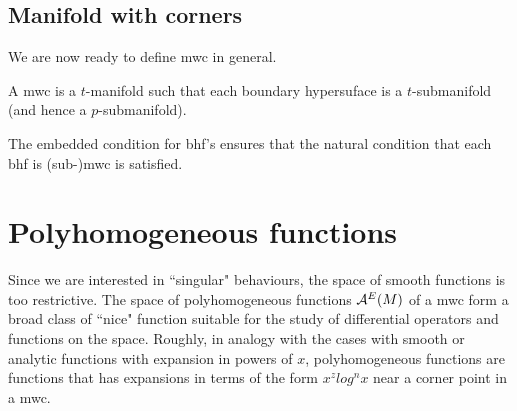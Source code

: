 \documentclass{article}
\begin{document}
\subsection{Manifold with corners}
We are now ready to define mwc in general. 
\begin{fdefinition}
A mwc is a $t$-manifold such that each boundary hypersuface is a $t$-submanifold (and hence a $p$-submanifold). 
\end{fdefinition}


The embedded condition for bhf's ensures that the natural condition that each bhf is (sub-)mwc is satisfied. 



\pagebreak 
\section{Polyhomogeneous functions}
Since we are interested in ``singular" behaviours, the space of smooth functions is too restrictive. The space of polyhomogeneous functions ${\cal A}^E(M)$ of a mwc form a broad class of ``nice" function suitable for the study of differential operators and functions on the space. Roughly, in analogy with the cases with smooth or analytic functions with expansion in powers of $x$, polyhomogeneous functions are functions that has expansions in terms of the form $x^z log^nx$  near a corner point in a mwc.  
\end{document}
